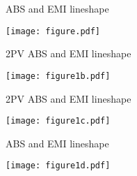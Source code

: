\documentclass[a4paper,12pt]{article}
\begin{document}
\hspace*{0.7cm} ABS and EMI lineshape

 \texttt{[image: figure.pdf]}

\clearpage

\hspace*{1.510cm} 2PV ABS and EMI lineshape

 \texttt{[image: figure1b.pdf]}

\clearpage

\hspace*{1.510cm} 2PV ABS and EMI lineshape

 \texttt{[image: figure1c.pdf]}

\clearpage

\hspace*{0.7cm} ABS and EMI lineshape

 \texttt{[image: figure1d.pdf]}

%
%


 

\end{document}
